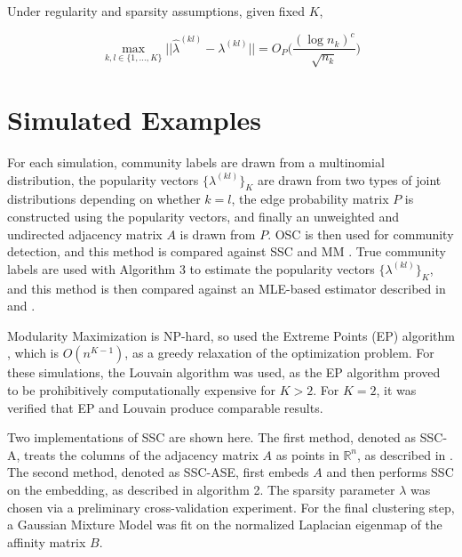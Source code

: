 \documentclass[12pt]{article}
\begin{document}
\begin{theorem}
\label{theorem6}
Under regularity and sparsity assumptions, given fixed $K$, 

\begin{equation} \label{eq:thm6}
\max_{k, l \in \{1, ..., K\}} 
||\hat{\lambda}^{(kl)} - \lambda^{(kl)}|| = 
O_P \bigg(\frac{(\log n_k)^c}{\sqrt{n_k}} \bigg)
\end{equation}
\end{theorem}

\hypertarget{simulated-examples}{%
\section{Simulated Examples}\label{simulated-examples}}

For each simulation, community labels are drawn from a multinomial
distribution, the popularity vectors \(\{\lambda^{(kl)}\}_K\) are drawn
from two types of joint distributions depending on whether \(k = l\),
the edge probability matrix \(P\) is constructed using the popularity
vectors, and finally an unweighted and undirected adjacency matrix \(A\)
is drawn from \(P\). OSC is then used for community detection, and this
method is compared against SSC \cite{noroozi2019estimation}
\cite{soltanolkotabi2014} and MM \cite{igraph}
\cite{307cbeb9b1be48299388437423d94bf1}. True community labels are used
with Algorithm 3 to estimate the popularity vectors
\(\{\lambda^{(kl)}\}_K\), and this method is then compared against an
MLE-based estimator described in \citeauthor{noroozi2019estimation} and
\citeauthor{307cbeb9b1be48299388437423d94bf1}.

Modularity Maximization is NP-hard, so
\citeauthor{307cbeb9b1be48299388437423d94bf1} used the Extreme Points
(EP) algorithm \cite{le2016}, which is \(O(n^{K - 1})\), as a greedy
relaxation of the optimization problem. For these simulations, the
Louvain algorithm was used, as the EP algorithm proved to be
prohibitively computationally expensive for \(K > 2\). For \(K = 2\), it
was verified that EP and Louvain produce comparable results.

Two implementations of SSC are shown here. The first method, denoted as
SSC-A, treats the columns of the adjacency matrix \(A\) as points in
\(\mathbb{R}^n\), as described in \citeauthor{noroozi2019estimation}.
The second method, denoted as SSC-ASE, first embeds \(A\) and then
performs SSC on the embedding, as described in algorithm 2. The sparsity
parameter \(\lambda\) was chosen via a preliminary cross-validation
experiment. For the final clustering step, a Gaussian Mixture Model was
fit on the normalized Laplacian eigenmap of the affinity matrix \(B\).
\end{document}

